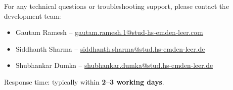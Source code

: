 \vspace{0.4cm}


%

\vspace{0.5cm}
\begin{tcolorbox}[colback=blue!5!white,colframe=blue!60!black,
	title={\faEnvelope\hspace{0.5em}Contact for Technical Assistance}, fonttitle=\bfseries]
	For any technical questions or troubleshooting support, please contact the development team:
	\begin{itemize}
		\item Gautam Ramesh – \href{mailto:gautam.ramesh.1@stud-hs-emden-leer.com}{gautam.ramesh.1@stud-hs-emden-leer.com}
		\item Siddhanth Sharma – \href{mailto:siddhanth.sharma@stud.hs-emden-leer.de}{siddhanth.sharma@stud.hs-emden-leer.de}
		\item Shubhankar Dumka – \href{mailto:shubhankar.dumka@stud.hs-emden-leer.de}{shubhankar.dumka@stud.hs-emden-leer.de}
	\end{itemize}
	Response time: typically within \textbf{2–3 working days}.
\end{tcolorbox}